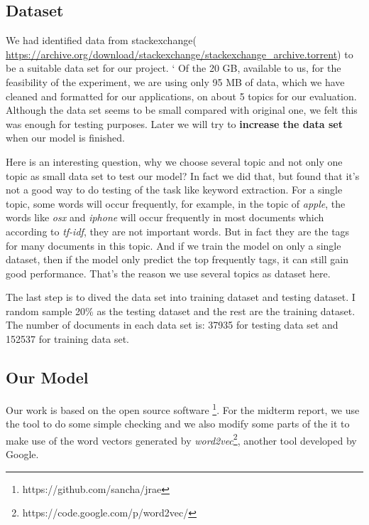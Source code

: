 \documentclass[dvips,12pt]{article}
\begin{document}
		\subsection{Dataset}
		
		We had identified data from stackexchange( \url{https://archive.org/download/stackexchange/stackexchange_archive.torrent}) to be a suitable data set for our project. 
		`
		Of the 20 GB, available to us, for the feasibility of the experiment, we are using only 95 MB of data, which we have cleaned and formatted for our applications, on about 5 topics for our evaluation. Although the data set seems to be small compared with original one, we felt this was enough for testing purposes. Later we will try to \textbf{increase the data set} when our model is finished.
        
        Here is an interesting question, why we choose several topic and not only one topic as small data set to test our model? In fact we did that, but found that it's not a good way to do testing of the task like keyword extraction. For a single topic, some words will occur frequently, for example, in the topic of \emph{apple}, the words like \emph{osx} and \emph{iphone} will occur frequently in most documents which according to \emph{tf-idf}, they are not important words. But in fact they are the tags for many documents in this topic. And if we train the model on only a single dataset, then if the model only predict the top frequently tags, it can still gain good performance. That's the reason we use several topics as dataset here.
        
        The last step is to dived the data set into training dataset and testing dataset. I random sample 20\% as the testing dataset and the rest are the training dataset. The number of documents in each data set is: 37935 for testing data set and 152537 for training data set.
        \subsection{Our Model}
        Our work is based on the open source software \footnote{https://github.com/sancha/jrae}. For the midterm report, we use the tool to do some simple checking and we also modify some parts of the it to make use of the word vectors generated by \emph{word2vec}\footnote{https://code.google.com/p/word2vec/}, another tool developed by Google.
        
\end{document}
